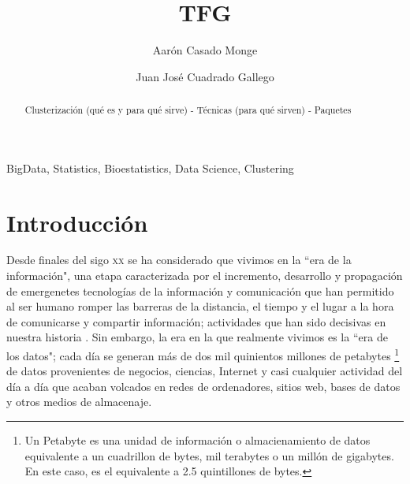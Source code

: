 \documentclass[3p,twocolumn]{elsarticle}
\begin{document}
\title{TFG} %

\author[1]{Aarón Casado Monge} %

\author[2]{Juan José Cuadrado Gallego} %

\address{University of Alcala, Polytechnic School, Computer Science Department, Scientific and Technological Campus, Politechnic Building. Office: O243, 28805, Alcala de Henares, Madrid, Spain}

\begin{abstract}
Clusterización (qué es y para qué sirve) - Técnicas (para qué sirven) - Paquetes 
\end{abstract}

\begin{keyword}
BigData, Statistics, Bioestatistics, Data Science, Clustering
\end{keyword}

\maketitle %
 
\section{Introducción}


Desde finales del sigo \textsc{xx} se ha considerado que vivimos en la ``era de la información", una etapa caracterizada por el incremento, desarrollo y propagación de emergenetes tecnologías de la información y comunicación que han permitido al ser humano romper las barreras de la distancia, el tiempo y el lugar a la hora de comunicarse y compartir información; actividades que han sido decisivas en nuestra historia \cite{cita1}. Sin embargo, la era en la que realmente vivimos es la ``era de los datos"; cada día se generan más de dos mil quinientos millones de petabytes \footnote {Un Petabyte es una unidad de información o almacienamiento de datos equivalente a un cuadrillon de bytes, mil terabytes o un millón de gigabytes. En este caso, es el equivalente a 2.5 quintillones de bytes.} de datos provenientes de negocios, ciencias, Internet y casi cualquier actividad del día a día \cite{cita2} que acaban volcados en redes de ordenadores, sitios web, bases de datos y otros medios de almacenaje. 
\end{document}
